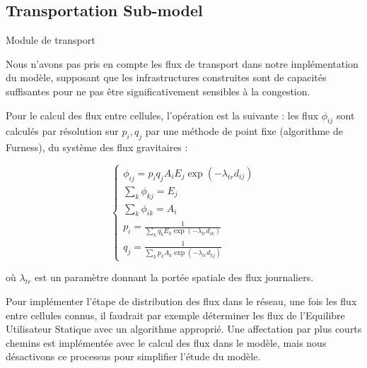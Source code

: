 \subsection{Transportation Sub-model}{Module de transport}

Nous n'avons pas pris en compte les flux de transport dans notre implémentation du modèle, supposant que les infrastructures construites sont de capacités suffisantes pour ne pas être significativement sensibles à la congestion.


Pour le calcul des flux entre cellules, l'opération est la suivante : les flux $\phi_{ij}$ sont calculés par résolution sur $p_i,q_j$ par une méthode de point fixe (algorithme de Furness), du système des flux gravitaires :


\[
\begin{cases}
\phi_{ij} = p_i q_j A_i E_j \exp{\left(-\lambda_{tr} d_{ij}\right)}\\
\sum_k \phi_{kj} = E_j\\
\sum_k \phi_{ik} = A_i\\
p_i = \frac{1}{\sum_k{q_k E_k \exp{(-\lambda_{tr}d_{ik})}}}\\
q_j = \frac{1}{\sum_k{p_k A_k \exp{(-\lambda_{tr}d_{kj})}}} 
\end{cases}
\]

où $\lambda_{tr}$ est un paramètre donnant la portée spatiale des flux journaliers.

Pour implémenter l'étape de distribution des flux dans le réseau, une fois les flux entre cellules connus, il faudrait par exemple déterminer les flux de l'Equilibre Utilisateur Statique avec un algorithme approprié. Une affectation par plus courts chemins est implémentée avec le calcul des flux dans le modèle, mais nous désactivons ce processus pour simplifier l'étude du modèle.




